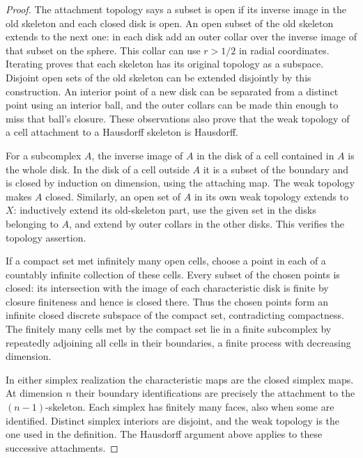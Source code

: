 \documentclass[11pt,oneside,openany]{book}
\theoremstyle{plain}
\theoremstyle{definition}
\theoremstyle{remark}
\begin{document}
\begin{proof}
The attachment topology says a subset is open if its inverse
image in the old skeleton and each closed disk is open.
An open subset of the old skeleton extends to the next one:
in each disk add an outer collar over the inverse image of
that subset on the sphere. This collar can use \(r>1/2\) in
radial coordinates. Iterating proves that each skeleton has
its original topology as a subspace. Disjoint open sets of
the old skeleton can be extended disjointly by this construction.
An interior point of a new disk can be separated from a
distinct point using an interior ball, and the outer collars
can be made thin enough to miss that ball's closure. These
observations also prove that the weak topology of a cell
attachment to a Hausdorff skeleton is Hausdorff.

For a subcomplex \(A\), the inverse image of \(A\) in the
disk of a cell contained in \(A\) is the whole disk. In the
disk of a cell outside \(A\) it is a subset of the boundary
and is closed by induction on dimension, using the attaching
map. The weak topology makes \(A\) closed. Similarly, an
open set of \(A\) in its own weak topology extends to \(X\):
inductively extend its old-skeleton part, use the given set
in the disks belonging to \(A\), and extend by outer collars
in the other disks. This verifies the topology assertion.

If a compact set met infinitely many open cells, choose a
point in each of a countably infinite collection of these
cells. Every subset of the chosen points is closed: its
intersection with the image of each characteristic disk is
finite by closure finiteness and hence is closed there.
Thus the chosen points form an infinite closed discrete
subspace of the compact set, contradicting compactness.
The finitely many cells met by the compact set lie in a
finite subcomplex by repeatedly adjoining all cells in
their boundaries, a finite process with decreasing
dimension.

In either simplex realization the characteristic maps are
the closed simplex maps. At dimension \(n\) their boundary
identifications are precisely the attachment to the
\((n-1)\)-skeleton. Each simplex has finitely many faces,
also when some are identified. Distinct simplex interiors
are disjoint, and the weak topology is the one used in
the definition. The Hausdorff argument above applies to
these successive attachments.
\end{proof}
\end{document}
